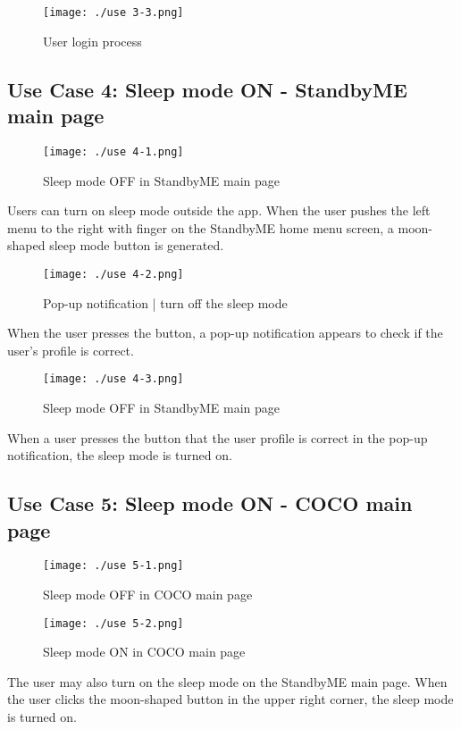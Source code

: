 \documentclass[conference]{IEEEtran}
\begin{document}
\begin{figure}[H]
\texttt{[image: ./use 3-3.png]}
\centering
\caption{User login process}
\end{figure}

\subsection{Use Case 4: Sleep mode ON - StandbyME main page}

\begin{figure}[H]
\texttt{[image: ./use 4-1.png]}
\centering
\caption{Sleep mode OFF in StandbyME main page}
\end{figure}

Users can turn on sleep mode outside the app. When the user pushes the left menu to the right with finger on the StandbyME home menu screen, a moon-shaped sleep mode button is generated.

\begin{figure}[H]
\texttt{[image: ./use 4-2.png]}
\centering
\caption{Pop-up notification | turn off the sleep mode}
\end{figure}

When the user presses the button, a pop-up notification appears to check if the user's profile is correct.

\begin{figure}[H]
\texttt{[image: ./use 4-3.png]}
\centering
\caption{Sleep mode OFF in StandbyME main page}
\end{figure}

When a user presses the button that the user profile is correct in the pop-up notification, the sleep mode is turned on.

\subsection{Use Case 5: Sleep mode ON - COCO main page}

\begin{figure}[H]
\texttt{[image: ./use 5-1.png]}
\centering
\caption{Sleep mode OFF in COCO main page}
\end{figure}

\begin{figure}[H]
\texttt{[image: ./use 5-2.png]}
\centering
\caption{Sleep mode ON in COCO main page}
\end{figure}

The user may also turn on the sleep mode on the StandbyME main page. When the user clicks the moon-shaped button in the upper right corner, the sleep mode is turned on.
\end{document}
